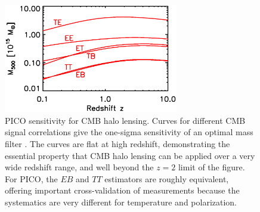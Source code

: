 \documentclass[PICOReport.tex]{subfiles}
\begin{document}
\begin{figure}[t]
\hspace{-0.1in}
\parbox{3.1in}{\centerline {
\includegraphics[width=3.0in]{images/m500lim_vs_z_pico_polar_v3.eps} } }
\hspace{0.in}
\parbox{3.4in}{
\caption{ \label{fig:HaloLensing} PICO sensitivity for CMB halo lensing.  Curves for different CMB signal correlations give the one-sigma sensitivity of an optimal mass filter \citep{2015A&A...578A..21M}.  The curves are flat at high redshift, demonstrating the essential property that CMB halo lensing can be applied over a very wide redshift range, and well beyond the $z=2$ limit of the figure.  For PICO, the $EB$ and $TT$ estimators are roughly equivalent, offering important cross-validation of measurements because the systematics are very different for temperature and polarization. } }
\vspace{-0.1in}
\end{figure}
\end{document}
